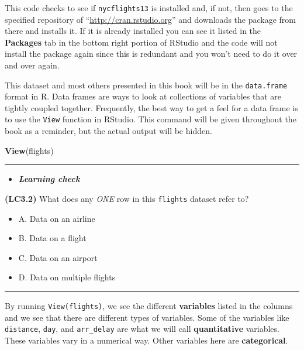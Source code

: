\documentclass[]{tufte-book}
\newenvironment{Shaded}{\begin{snugshade}}{\end{snugshade}}
\newcommand{\KeywordTok}[1]{\textcolor[rgb]{0.13,0.29,0.53}{\textbf{{#1}}}}
\newcommand{\NormalTok}[1]{{#1}}
\let\oldrule=\rule
\renewcommand{\rule}[1]{\oldrule{\linewidth}}
\providecommand{\tightlist}{%
  \setlength{\itemsep}{0pt}\setlength{\parskip}{0pt}}
\newenvironment{rmdblock}[1]
  {\begin{shaded*}
  \begin{itemize}
  \renewcommand{\labelitemi}{
    \raisebox{-.7\height}[0pt][0pt]{
    }
  }
  \item
  }
  {
  \end{itemize}
  \end{shaded*}
  }
\newenvironment{learncheck}
  {\begin{rmdblock}{warning}}
  {\end{rmdblock}}
\begin{document}
This code checks to see if \texttt{nycflights13} is installed and, if
not, then goes to the specified repository of
``\url{http://cran.rstudio.org}'' and downloads the package from there
and installs it. If it is already installed you can see it listed in the
\textbf{Packages} tab in the bottom right portion of RStudio and the
code will not install the package again since this is redundant and you
won't need to do it over and over again.

This dataset and most others presented in this book will be in the
\texttt{data.frame} format in R. Data frames are ways to look at
collections of variables that are tightly coupled together. Frequently,
the best way to get a feel for a data frame is to use the \texttt{View}
function in RStudio. This command will be given throughout the book as a
reminder, but the actual output will be hidden.

\begin{Shaded}
\begin{Highlighting}[]
\KeywordTok{View}\NormalTok{(flights)}
\end{Highlighting}
\end{Shaded}

\begin{center}\rule{0.5\linewidth}{\linethickness}\end{center}

\begin{learncheck}
\textbf{\emph{Learning check}}
\end{learncheck}

\textbf{(LC3.2)} What does any \emph{ONE} row in this \texttt{flights}
dataset refer to?

\begin{itemize}
\tightlist
\item
  A. Data on an airline
\item
  B. Data on a flight
\item
  C. Data on an airport
\item
  D. Data on multiple flights
\end{itemize}

\begin{center}\rule{0.5\linewidth}{\linethickness}\end{center}

By running \texttt{View(flights)}, we see the different
\textbf{variables} listed in the columns and we see that there are
different types of variables. Some of the variables like
\texttt{distance}, \texttt{day}, and \texttt{arr\_delay} are what we
will call \textbf{quantitative} variables. These variables vary in a
numerical way. Other variables here are \textbf{categorical}.
\end{document}
